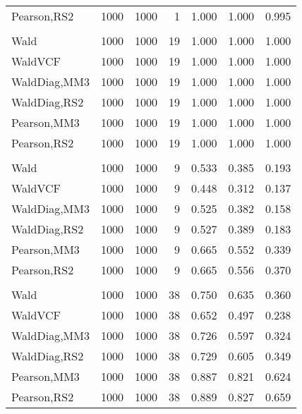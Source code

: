 \documentclass[
]{article}
\begin{document}
\begin{table}[H]
{\begin{tabular}[t]{lrrrrrr}
\hspace{1em}Pearson,RS2 & 1000 & 1000 & 1 & 1.000 & 1.000 & 0.995\\
\addlinespace[0.3em]
\multicolumn{7}{l}{\textbf{1F 15V}}\\
\hspace{1em}Wald & 1000 & 1000 & 19 & 1.000 & 1.000 & 1.000\\
\hspace{1em}WaldVCF & 1000 & 1000 & 19 & 1.000 & 1.000 & 1.000\\
\hspace{1em}WaldDiag,MM3 & 1000 & 1000 & 19 & 1.000 & 1.000 & 1.000\\
\hspace{1em}WaldDiag,RS2 & 1000 & 1000 & 19 & 1.000 & 1.000 & 1.000\\
\hspace{1em}Pearson,MM3 & 1000 & 1000 & 19 & 1.000 & 1.000 & 1.000\\
\hspace{1em}Pearson,RS2 & 1000 & 1000 & 19 & 1.000 & 1.000 & 1.000\\
\addlinespace[0.3em]
\multicolumn{7}{l}{\textbf{2F 10V}}\\
\hspace{1em}Wald & 1000 & 1000 & 9 & 0.533 & 0.385 & 0.193\\
\hspace{1em}WaldVCF & 1000 & 1000 & 9 & 0.448 & 0.312 & 0.137\\
\hspace{1em}WaldDiag,MM3 & 1000 & 1000 & 9 & 0.525 & 0.382 & 0.158\\
\hspace{1em}WaldDiag,RS2 & 1000 & 1000 & 9 & 0.527 & 0.389 & 0.183\\
\hspace{1em}Pearson,MM3 & 1000 & 1000 & 9 & 0.665 & 0.552 & 0.339\\
\hspace{1em}Pearson,RS2 & 1000 & 1000 & 9 & 0.665 & 0.556 & 0.370\\
\addlinespace[0.3em]
\multicolumn{7}{l}{\textbf{3F 15V}}\\
\hspace{1em}Wald & 1000 & 1000 & 38 & 0.750 & 0.635 & 0.360\\
\hspace{1em}WaldVCF & 1000 & 1000 & 38 & 0.652 & 0.497 & 0.238\\
\hspace{1em}WaldDiag,MM3 & 1000 & 1000 & 38 & 0.726 & 0.597 & 0.324\\
\hspace{1em}WaldDiag,RS2 & 1000 & 1000 & 38 & 0.729 & 0.605 & 0.349\\
\hspace{1em}Pearson,MM3 & 1000 & 1000 & 38 & 0.887 & 0.821 & 0.624\\
\hspace{1em}Pearson,RS2 & 1000 & 1000 & 38 & 0.889 & 0.827 & 0.659\\
\bottomrule
\end{tabular}}
\endgroup{}
\end{table}
\end{document}
